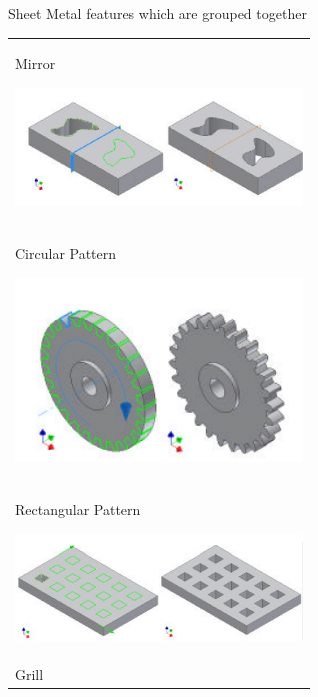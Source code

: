 \begin{frame}{Sheet Metal features which are grouped together}
\begin{tabular}[h]{@{} p{0.6\linewidth}@{}}

Mirror

\includegraphics[width=0.6\linewidth]{..//Common/images/Feature_Mirror.png} \\

Circular Pattern

\includegraphics[width=0.6\linewidth]{..//Common/images/Feature_CircPattern.png} \\

Rectangular Pattern

\includegraphics[width=0.6\linewidth]{..//Common/images/Feature_RectPattern.png} \\

Grill \\

\end{tabular}

\end{frame}
